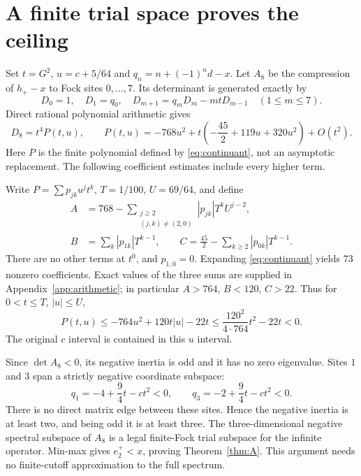 \documentclass[11pt]{article}
\newcommand{\abs}[1]{\left|#1\right|}
\begin{document}
\section{A finite trial space proves the ceiling}
Set $t=G^2$, $u=c+5/64$ and $q_n=n+(-1)^n d-x$. Let $A_8$ be the compression of $h_+-x$ to Fock sites $0,\ldots,7$. Its determinant is generated exactly by
\begin{equation}\label{eq:continuant}
D_0=1,\quad D_1=q_0,\quad
D_{m+1}=q_mD_m-mtD_{m-1}\quad(1\leq m\leq7).
\end{equation}
Direct rational polynomial arithmetic gives
\begin{equation}\label{eq:poly}
D_8=t^4P(t,u),\qquad
P(t,u)=-768u^2+
t\left(-\frac{45}2+119u+320u^2\right)+O(t^2).
\end{equation}
Here $P$ is the finite polynomial defined by \eqref{eq:continuant}, not an asymptotic replacement. The following coefficient estimates include every higher term.

Write $P=\sum p_{jk}u^jt^k$, $T=1/100$, $U=69/64$, and define
\begin{align}
A&=768-\!\!\sum_{\substack{j\geq2\\(j,k)\ne(2,0)}}\abs{p_{jk}}T^kU^{j-2},\nonumber\\
B&=\sum_k\abs{p_{1k}}T^{k-1},\qquad
C=\frac{45}2-\sum_{k\geq2}\abs{p_{0k}}T^{k-1}.\label{eq:ABC}
\end{align}
There are no other terms at $t^0$, and $p_{1,0}=0$. Expanding \eqref{eq:continuant} yields 73 nonzero coefficients. Exact values of the three sums are supplied in Appendix~\ref{app:arithmetic}; in particular
$A>764$, $B<120$, $C>22$. Thus for $0<t\leq T$, $|u|\leq U$,
\begin{equation}\label{eq:negative}
P(t,u)\leq-764u^2+120t|u|-22t
\leq \frac{120^2}{4\cdot764}t^2-22t<0 .
\end{equation}
The original $c$ interval is contained in this $u$ interval.

Since $\det A_8<0$, its negative inertia is odd and it has no zero eigenvalue. Sites $1$ and $3$ span a strictly negative coordinate subspace:
\[
q_1=-4+\frac94t-ct^2<0,\qquad
q_3=-2+\frac94t-ct^2<0.
\]
There is no direct matrix edge between these sites. Hence the negative inertia is at least two, and being odd it is at least three. The three-dimensional negative spectral subspace of $A_8$ is a legal finite-Fock trial subspace for the infinite operator. Min-max gives $e_2^+<x$, proving Theorem~\ref{thm:A}. This argument needs no finite-cutoff approximation to the full spectrum.
\end{document}
